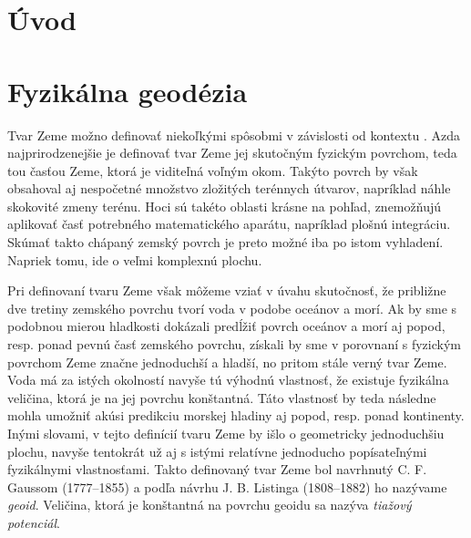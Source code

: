 \documentclass[a4paper, 12pt]{book}
\begin{document}
\tableofcontents
\newpage







\chapter*{Úvod}







\chapter{Fyzikálna geodézia}

Tvar Zeme možno definovať niekoľkými spôsobmi v závislosti od kontextu 
\citep{MoritzTheFigureOfTheEarth}.  Azda najprirodzenejšie je definovať tvar 
Zeme jej skutočným fyzickým povrchom, teda tou časťou Zeme, ktorá je viditeľná 
voľným okom.  Takýto povrch by však obsahoval aj nespočetné množstvo zložitých 
terénnych útvarov, napríklad náhle skokovité zmeny terénu.  Hoci sú takéto 
oblasti krásne na pohľad, znemožňujú aplikovať časť potrebného matematického 
aparátu, napríklad plošnú integráciu.  Skúmať takto chápaný zemský povrch je 
preto možné iba po istom vyhladení.  Napriek tomu, ide o veľmi komplexnú 
plochu.

Pri definovaní tvaru Zeme však môžeme vziať v úvahu skutočnosť, že približne 
dve tretiny zemského povrchu tvorí voda v podobe oceánov a morí.  Ak by sme 
s podobnou mierou hladkosti dokázali predĺžiť povrch oceánov a morí aj popod, 
resp. ponad pevnú časť zemského povrchu, získali by sme v porovnaní s fyzickým 
povrchom Zeme značne jednoduchší a hladší, no pritom stále verný tvar Zeme.  
Voda má za istých okolností navyše tú výhodnú vlastnosť, že existuje fyzikálna 
veličina, ktorá je na jej povrchu konštantná.  Táto vlastnosť by teda následne 
mohla umožniť akúsi predikciu morskej hladiny aj popod, resp. ponad kontinenty.  
Inými slovami, v tejto definícií tvaru Zeme by išlo o geometricky jednoduchšiu 
plochu, navyše tentokrát už aj s istými relatívne jednoducho popísateľnými 
fyzikálnymi vlastnosťami.  Takto definovaný tvar Zeme bol navrhnutý 
C. F. Gaussom (1777--1855) a podľa návrhu J. B. Listinga (1808--1882) ho 
nazývame \emph{geoid}.  Veličina, ktorá je konštantná na povrchu geoidu sa 
nazýva \emph{tiažový potenciál}.
\end{document}
